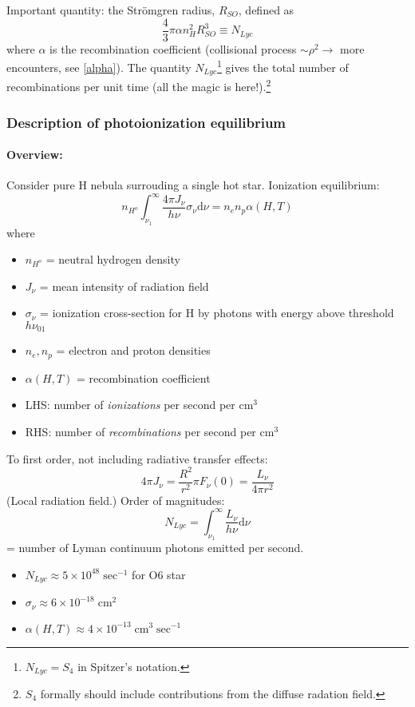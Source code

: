 \documentclass[12pt]{article}
\newcommand{\mar}[1]{\hspace{0pt}\marginpar{-\textcolor{black}{#1}-}}
\begin{document}
Important quantity: the Str\"{o}mgren radius, $R_{SO}$, defined as$${
    \frac{4}{3}\pi\alpha{n_{H}^{2}}{R_{SO}^{3}} \equiv N_{Lyc}
}$$
where $\alpha$ is the recombination coefficient
(collisional process $\sim\rho^{2} \rightarrow$ more encounters, see \ref{alpha}).
The quantity $N_{Lyc}$\footnote{$N_{Lyc} = S_{4}$ in Spitzer's notation.}
gives the total number of recombinations per unit
time (all the magic is here!).\footnote{$S_{4}$ formally should include
contributions from the diffuse radation field.}

\mar{53}\subsubsection{Description of photoionization equilibrium}
\paragraph{Overview:} Consider pure H nebula surrouding a single hot star.
Ionization equilibrium:$${
    n_{H^{o}}\int_{\nu_{1}}^{\infty}{\frac{4\pi{J_{\nu}}}{h\nu}\sigma_{\nu}\mathrm{d}\nu} =
    n_{e}n_{p}\alpha(H,T)
}$$where
\begin{itemize}
    \item $n_{H^{o}}$ = neutral hydrogen density
    \item $J_{\nu}$ = mean intensity of radiation field
    \item $\sigma_{\nu}$ = ionization cross-section for H by photons with
        energy above threshold $h\nu_{01}$
    \item $n_{e}, n_{p}$ = electron and proton densities
    \item $\alpha(H,T)$ = recombination coefficient
    \item LHS: number of \emph{ionizations} per second per cm$^{3}$
    \item RHS: number of \emph{recombinations} per second per cm$^{3}$
\end{itemize}
To first order, not including radiative transfer effects:$${
    4\pi{J_{\nu}} = \frac{R^{2}}{r^{2}}\pi{F_{\nu}}(0) =
    \frac{L_{\nu}}{4\pi{r^{2}}}
}$$
(Local radiation field.) Order of magnitudes:$${
    N_{Lyc} = \int_{\nu_{1}}^{\infty}{\frac{L_{\nu}}{h\nu}\mathrm{d}\nu}
}$$= number of Lyman continuum photons emitted per second.
\begin{itemize}
    \item $N_{Lyc} \approx 5\times10^{48}\;\mathrm{sec}^{-1}$ for O6 star
    \item $\sigma_{\nu} \approx 6\times10^{-18}\;\mathrm{cm}^{2}$
    \item $\alpha(H,T) \approx 4\times10^{-13}\;\mathrm{cm}^{3}\;\mathrm{sec}^{-1}$
\end{itemize}
\end{document}
